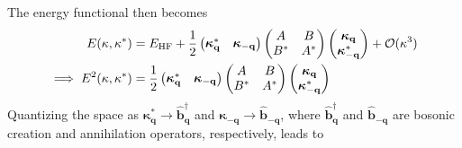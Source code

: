 The energy functional then becomes
\begin{align}
        E(\mathbf \kappa, \mathbf \kappa^{*})
    &= E_{\rm HF}
    +
    \frac{1}{2}
    \begin{pmatrix}
        \boldsymbol{\kappa}_{\mathbf q}^{*} &
        \boldsymbol{\kappa}_{-\mathbf q}
    \end{pmatrix}
    \begin{pmatrix}
        A & B\\
        B^{*} & A^{*}
    \end{pmatrix}
    \begin{pmatrix}
        \boldsymbol{\kappa}_{\mathbf q}\\
        \boldsymbol{\kappa}_{-\mathbf q}^{*}
    \end{pmatrix}
    +
    \mathcal O(\mathbf \kappa^3)\\
\implies E^{2}(\mathbf \kappa, \mathbf \kappa^{*})
    &=
    \frac{1}{2}
    \begin{pmatrix}
        \boldsymbol{\kappa}_{\mathbf q}^{*} &
        \boldsymbol{\kappa}_{-\mathbf q}
    \end{pmatrix}
    \begin{pmatrix}
        A & B\\
        B^{*} & A^{*}
    \end{pmatrix}
    \begin{pmatrix}
        \boldsymbol{\kappa}_{\mathbf q}\\
        \boldsymbol{\kappa}_{-\mathbf q}^{*}
    \end{pmatrix}
\end{align}
Quantizing the space as $\bm{\kappa}^{*}_{\mathbf q} \to \hat{\bm{b}}_{\mathbf q}^{\dagger}$ and $\bm{\kappa}_{-\mathbf q} \to \hat{\bm{b}}_{-\mathbf q}$, where $\hat{\bm{b}}_{\mathbf q}^{\dagger}$ and $\hat{\bm{b}}_{-\mathbf q}$ are bosonic creation and annihilation operators, respectively, leads to
